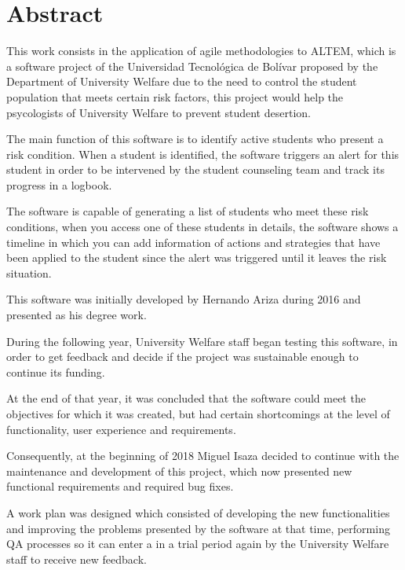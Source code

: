 \chapter{Abstract}

This work consists in the application of agile methodologies to ALTEM, which is a software project of the Universidad Tecnológica de Bolívar proposed by the Department of University Welfare due to the need to control the student population that meets certain risk factors, this project would help the psycologists of University Welfare to prevent student desertion.

The main function of this software is to identify active students who present a risk condition. When a student is identified, the software triggers an alert for this student in order to be intervened by the student counseling team and track its progress in a logbook. 

The software is capable of generating a list of students who meet these risk conditions, when you access one of these students in details, the software shows a timeline in which you can add information of actions and strategies that have been applied to the student since the alert was triggered until it leaves the risk situation. 

This software was initially developed by Hernando Ariza during 2016 and presented as his degree work. 

During the following year, University Welfare staff began testing this software, in order to get feedback and decide if the project was sustainable enough to continue its funding. 

At the end of that year, it was concluded that the software could meet the objectives for which it was created, but had certain shortcomings at the level of functionality, user experience and requirements.

Consequently, at the beginning of 2018 Miguel Isaza decided to continue with the maintenance and development of this project, which now presented new functional requirements and required bug fixes.

A work plan was designed which consisted of developing the new functionalities and improving the problems presented by the software at that time, performing QA processes so it can enter a in a trial period again by the University Welfare staff to receive new feedback. 